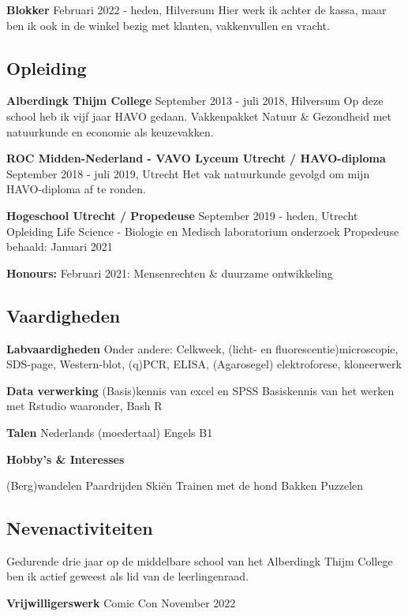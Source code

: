 \documentclass[
]{book}
\begin{document}
\textbf{Blokker}
Februari 2022 - heden, Hilversum
Hier werk ik achter de kassa, maar ben ik ook in de winkel bezig met klanten, vakkenvullen en vracht.

\hypertarget{opleiding}{%
\subsection*{Opleiding}\label{opleiding}}

\textbf{Alberdingk Thijm College}
September 2013 - juli 2018, Hilversum
Op deze school heb ik vijf jaar HAVO gedaan.
Vakkenpakket Natuur \& Gezondheid met natuurkunde en economie als keuzevakken.

\textbf{ROC Midden-Nederland - VAVO Lyceum Utrecht / HAVO-diploma}
September 2018 - juli 2019, Utrecht
Het vak natuurkunde gevolgd om mijn HAVO-diploma af te ronden.

\textbf{Hogeschool Utrecht / Propedeuse}
September 2019 - heden, Utrecht
Opleiding Life Science - Biologie en Medisch laboratorium onderzoek
Propedeuse behaald: Januari 2021

\textbf{Honours:}
Februari 2021: Mensenrechten \& duurzame ontwikkeling

\hypertarget{vaardigheden}{%
\subsection*{Vaardigheden}\label{vaardigheden}}

\textbf{Labvaardigheden}
Onder andere:
Celkweek, (licht- en fluorescentie)microscopie, SDS-page, Western-blot, (q)PCR, ELISA, (Agarosegel) elektroforese, kloneerwerk

\textbf{Data verwerking}
(Basis)kennis van excel en SPSS
Basiskennis van het werken met Rstudio waaronder,
Bash
R

\textbf{Talen}
Nederlands (moedertaal)
Engels B1

\textbf{Hobby's \& Interesses}

(Berg)wandelen
Paardrijden
Skiën
Trainen met de hond
Bakken
Puzzelen

\hypertarget{nevenactiviteiten}{%
\subsection*{Nevenactiviteiten}\label{nevenactiviteiten}}

Gedurende drie jaar op de middelbare school van het Alberdingk Thijm College ben ik actief geweest als lid van de leerlingenraad.

\textbf{Vrijwilligerswerk}
Comic Con November 2022
\end{document}
